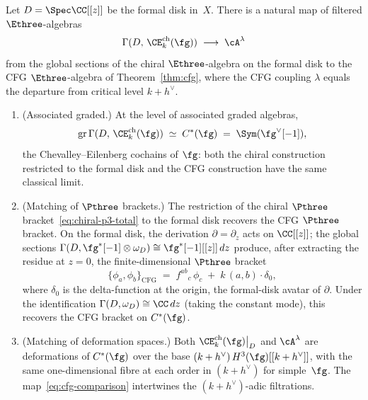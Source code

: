 \begin{theorem}
\label{thm:chiral-e3-cfg}
Let $D = \Spec \CC[[z]]$ be the formal disk in~$X$.
There is a natural map of filtered $\Ethree$-algebras
\begin{equation}\label{eq:cfg-comparison}
  \Gamma(D,\, \CE^{\mathrm{ch}}_k(\fg))
  \;\longrightarrow\;
  \cA^\lambda
\end{equation}
from the global sections of the chiral $\Ethree$-algebra
on the formal disk to the CFG $\Ethree$-algebra of
Theorem~\textup{\ref{thm:cfg}}, where the CFG coupling
$\lambda$ equals the departure from critical level
$k + h^\vee$.
\begin{enumerate}[label=\textup{(\roman*)}]
\item \textup{(Associated graded.)}
  At the level of associated graded algebras,
  \begin{equation}\label{eq:cfg-assoc-graded}
    \mathrm{gr}\,\Gamma(D,\, \CE^{\mathrm{ch}}_k(\fg))
    \;\simeq\;
    C^*(\fg)
    \;=\;
    \Sym(\fg^\vee[-1]),
  \end{equation}
  the Chevalley--Eilenberg cochains of $\fg$: both the
  chiral construction restricted to the formal disk and the
  CFG construction have the same classical limit.
\item \textup{(Matching of $\Pthree$ brackets.)}
  The restriction of the chiral $\Pthree$
  bracket~\eqref{eq:chiral-p3-total} to the formal disk
  recovers the CFG $\Pthree$ bracket.
  On the formal disk, the derivation $\partial = \partial_z$
  acts on $\CC[[z]]$; the global sections
  $\Gamma(D, \fg^*[-1] \otimes \omega_D)
  \cong \fg^*[-1][[z]]\,dz$ produce, after extracting the
  residue at $z = 0$, the finite-dimensional $\Pthree$
  bracket
  \[
    \{\phi_a, \phi_b\}_{\mathrm{CFG}}
    \;=\;
    f^{ab}{}_c\,\phi_c
    \;+\;
    k\,(a,b) \cdot \delta_0,
  \]
  where $\delta_0$ is the delta-function at the origin,
  the formal-disk avatar of $\partial$. Under the
  identification $\Gamma(D, \omega_D) \cong \CC\,dz$
  \textup{(}taking the constant mode\textup{)}, this
  recovers the CFG bracket on $C^*(\fg)$.
\item \textup{(Matching of deformation spaces.)}
  Both $\CE^{\mathrm{ch}}_k(\fg)\big|_D$ and
  $\cA^\lambda$ are deformations of $C^*(\fg)$ over the
  base $(k+h^\vee)\,H^3(\fg)[[k+h^\vee]]$, with the same
  one-dimensional fibre at each order in $(k+h^\vee)$ for
  simple~$\fg$.
  The map~\eqref{eq:cfg-comparison} intertwines
  the $(k+h^\vee)$-adic filtrations.
\end{enumerate}
\end{theorem}

